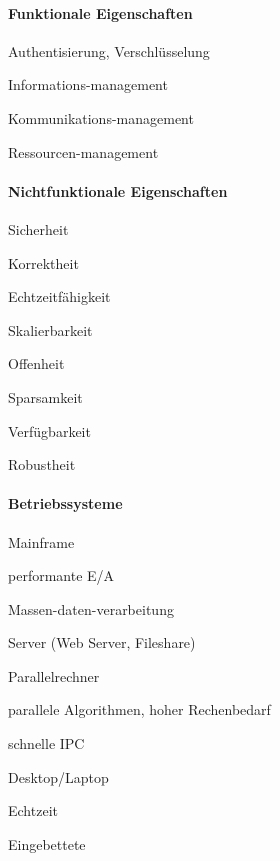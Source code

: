 \documentclass[a4paper]{article}
\begin{document}
\begin{multicols}{3}
  \paragraph{Funktionale Eigenschaften}
  \begin{itemize*}
    \item Authentisierung, Verschlüsselung
    \item Informations-management
    \item Kommunikations-management
    \item Ressourcen-management
  \end{itemize*}

  \paragraph{Nichtfunktionale Eigenschaften}
  \begin{itemize*}
    \item     Sicherheit
    \item Korrektheit
    \item Echtzeitfähigkeit
    \item Skalierbarkeit
    \item Offenheit
    \item Sparsamkeit
    \item Verfügbarkeit
    \item Robustheit
  \end{itemize*}

  \paragraph{Betriebssysteme}
  \begin{itemize*}
    \item     Mainframe
    \begin{itemize*}
      \item performante E/A
      \item Massen-daten-verarbeitung
    \end{itemize*}
    \item Server (Web Server, Fileshare)
    \item Parallelrechner
    \begin{itemize*}
      \item parallele Algorithmen, hoher Rechenbedarf
      \item schnelle IPC
    \end{itemize*}
    \item Desktop/Laptop
    \item Echtzeit
    \item Eingebettete
  \end{itemize*}


\end{multicols}
\end{document}
